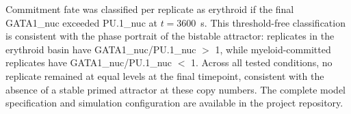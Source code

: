 Commitment fate was classified per replicate as erythroid if the final GATA1\_nuc exceeded PU.1\_nuc at $t = 3600$~s. This threshold-free classification is consistent with the phase portrait of the bistable attractor: replicates in the erythroid basin have GATA1\_nuc/PU.1\_nuc $>$ 1, while myeloid-committed replicates have GATA1\_nuc/PU.1\_nuc $<$ 1. Across all tested conditions, no replicate remained at equal levels at the final timepoint, consistent with the absence of a stable primed attractor at these copy numbers. The complete model specification and simulation configuration are available in the project repository.
